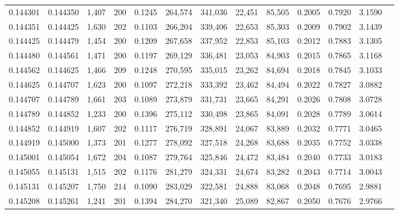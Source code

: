 \begin{tabular}{rrrrrrrrrrrrr}
0.144301 & 0.144350 & 1,407 & 200 &                                     0.1245 & 264,574 & 341,036 &  22,451 &  85,505 & 0.2005 & 0.7920 & 3.1590 \\
0.144351 & 0.144425 & 1,630 & 202 &                                     0.1103 & 266,204 & 339,406 &  22,653 &  85,303 & 0.2009 & 0.7902 & 3.1439 \\
0.144425 & 0.144479 & 1,454 & 200 &                                     0.1209 & 267,658 & 337,952 &  22,853 &  85,103 & 0.2012 & 0.7883 & 3.1305 \\
0.144480 & 0.144561 & 1,471 & 200 &                                     0.1197 & 269,129 & 336,481 &  23,053 &  84,903 & 0.2015 & 0.7865 & 3.1168 \\
0.144562 & 0.144625 & 1,466 & 209 &                                     0.1248 & 270,595 & 335,015 &  23,262 &  84,694 & 0.2018 & 0.7845 & 3.1033 \\
0.144625 & 0.144707 & 1,623 & 200 &                                     0.1097 & 272,218 & 333,392 &  23,462 &  84,494 & 0.2022 & 0.7827 & 3.0882 \\
0.144707 & 0.144789 & 1,661 & 203 &                                     0.1089 & 273,879 & 331,731 &  23,665 &  84,291 & 0.2026 & 0.7808 & 3.0728 \\
0.144789 & 0.144852 & 1,233 & 200 &                                     0.1396 & 275,112 & 330,498 &  23,865 &  84,091 & 0.2028 & 0.7789 & 3.0614 \\
0.144852 & 0.144919 & 1,607 & 202 &                                     0.1117 & 276,719 & 328,891 &  24,067 &  83,889 & 0.2032 & 0.7771 & 3.0465 \\
0.144919 & 0.145000 & 1,373 & 201 &                                     0.1277 & 278,092 & 327,518 &  24,268 &  83,688 & 0.2035 & 0.7752 & 3.0338 \\
0.145001 & 0.145054 & 1,672 & 204 &                                     0.1087 & 279,764 & 325,846 &  24,472 &  83,484 & 0.2040 & 0.7733 & 3.0183 \\
0.145055 & 0.145131 & 1,515 & 202 &                                     0.1176 & 281,279 & 324,331 &  24,674 &  83,282 & 0.2043 & 0.7714 & 3.0043 \\
0.145131 & 0.145207 & 1,750 & 214 &                                     0.1090 & 283,029 & 322,581 &  24,888 &  83,068 & 0.2048 & 0.7695 & 2.9881 \\
0.145208 & 0.145261 & 1,241 & 201 &                                     0.1394 & 284,270 & 321,340 &  25,089 &  82,867 & 0.2050 & 0.7676 & 2.9766 \\

\end{tabular}
